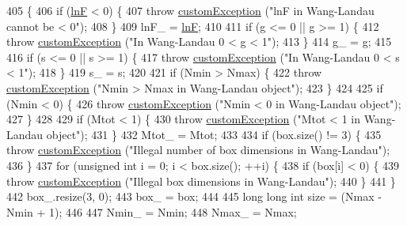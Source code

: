 \begin{DoxyCode}
405                                                                                                            
                                     \{
406     \textcolor{keywordflow}{if} (\hyperlink{classwala_acb8e59580d97bc3c5b9b4ff45eb6bb9a}{lnF} < 0) \{
407         \textcolor{keywordflow}{throw} \hyperlink{classcustom_exception}{customException} (\textcolor{stringliteral}{"lnF in Wang-Landau cannot be < 0"});
408     \}
409     lnF\_ = \hyperlink{classwala_acb8e59580d97bc3c5b9b4ff45eb6bb9a}{lnF};
410 
411     \textcolor{keywordflow}{if} (g <= 0 || g >= 1) \{
412         \textcolor{keywordflow}{throw} \hyperlink{classcustom_exception}{customException} (\textcolor{stringliteral}{"In Wang-Landau 0 < g < 1"});
413     \}
414     g\_ = g;
415 
416     \textcolor{keywordflow}{if} (s <= 0 || s >= 1) \{
417         \textcolor{keywordflow}{throw} \hyperlink{classcustom_exception}{customException} (\textcolor{stringliteral}{"In Wang-Landau 0 < s < 1"});
418     \}
419     s\_ = s;
420 
421     \textcolor{keywordflow}{if} (Nmin > Nmax) \{
422         \textcolor{keywordflow}{throw} \hyperlink{classcustom_exception}{customException} (\textcolor{stringliteral}{"Nmin > Nmax in Wang-Landau object"});
423     \}
424 
425     \textcolor{keywordflow}{if} (Nmin < 0) \{
426         \textcolor{keywordflow}{throw} \hyperlink{classcustom_exception}{customException} (\textcolor{stringliteral}{"Nmin < 0 in Wang-Landau object"});
427     \}
428 
429     \textcolor{keywordflow}{if} (Mtot < 1) \{
430         \textcolor{keywordflow}{throw} \hyperlink{classcustom_exception}{customException} (\textcolor{stringliteral}{"Mtot < 1 in Wang-Landau object"});
431     \}
432     Mtot\_ = Mtot;
433 
434     \textcolor{keywordflow}{if} (box.size() != 3) \{
435         \textcolor{keywordflow}{throw} \hyperlink{classcustom_exception}{customException} (\textcolor{stringliteral}{"Illegal number of box dimensions in Wang-Landau"});
436     \}
437     \textcolor{keywordflow}{for} (\textcolor{keywordtype}{unsigned} \textcolor{keywordtype}{int} i = 0; i < box.size(); ++i) \{
438         \textcolor{keywordflow}{if} (box[i] < 0) \{
439             \textcolor{keywordflow}{throw} \hyperlink{classcustom_exception}{customException} (\textcolor{stringliteral}{"Illegal box dimensions in Wang-Landau"});
440         \}
441     \}
442     box\_.resize(3, 0);
443     box\_ = box;
444 
445     \textcolor{keywordtype}{long} \textcolor{keywordtype}{long} \textcolor{keywordtype}{int} size = (Nmax - Nmin + 1);
446 
447     Nmin\_ = Nmin;
448     Nmax\_ = Nmax;

\end{DoxyCode}
